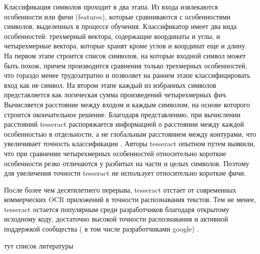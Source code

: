 \documentclass[oneside,final,14pt]{extreport}
\begin{document}
Классификация символов проходит в два этапа. Из входа извлекаются особенности или фичи (features), которые сравниваются с особенностями символов, выделенных в процессе обучения. Классификатор имеет два вида особенностей: трехмерный вектора, содержащие координаты и углы, и четырехмерные вектора, которые хранят кроме углов и координат еще и длину. На первом этапе строится список символов, на которые входной символ может быть похож, причем производится сравнения только трехмерных особенностей, что гораздо менее трудозатратно и позволяет  на раннем этапе классифицировать вход как не символ. На втором этапе каждый из избранных символов представляется как логическая сумма произведений четырехмерных фич. Вычисляется расстояние между входом и каждым символом, на основе которого строится окончательное решение. Благодаря представлению, при вычислении расстояний tesseract распоряжается информацией о расстоянии между каждой особенностью в отдельности, а не глобальным расстоянием между контурами, что увеличивает точность классификации .  Авторы tesseract опытном путем выявили, что при сравнении четырехмерных особенностей относительно короткие особенности резко отличаются у разбитых на части и целых символов. Поэтому для увеличения точности tesseract не использует относительно короткие фичи. 

После более чем десятилетнего перерыва, tesseract отстает от современных коммерческих OCR приложений в точности распознавания текстов. Тем не менее, tesseract остается популярным среди разработчиков благодаря открытому исходному коду, достаточно высокой точности распознавания и активной поддержкой сообщества ( в том числе разработчиками google) . 

\newpage
тут список литературы
\end{document}
